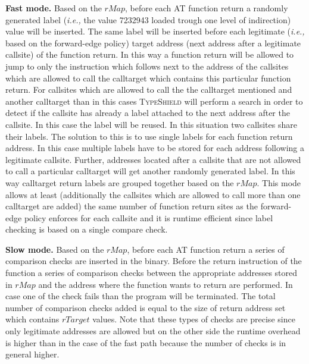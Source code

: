 \textbf{Fast mode.} Based on the $rMap$, before each AT function return a randomly generated label (\textit{i.e.,} the value 7232943 loaded trough one level of indirection) 
value will be inserted. The same label will be inserted before each legitimate (\textit{i.e.,} based on the forward-edge policy) target address (next address after a legitimate callsite) of the function return. 
In this way a function return will be allowed to jump to only the instruction which follows next to the 
address of the callsites which are allowed to call the calltarget which contains this particular function return. 
For callsites which are allowed to call the the calltarget mentioned and another calltarget than in this cases \textsc{TypeShield} will perform a search in order to detect if the callsite
has already a label attached to the next address after the callsite. In this case the label will be reused. In this situation two callsites share their labels. The solution to this is to 
use single labels for each function return address. In this case multiple labels have to be stored for each address following a legitimate callsite.
Further, addresses located after a callsite that are not allowed to call a particular calltarget will get another randomly generated label. 
In this way calltarget return labels are grouped together based on the $rMap$. This mode allows 
at least (additionally the callsites which are allowed to call more than one calltarget are added) the same number of function return sites as the 
forward-edge policy enforces for each callsite and it is runtime efficient since label checking is based on a single compare check.

\textbf{Slow mode.} Based on the $rMap$, before each AT function return a series of comparison checks are inserted in the binary. 
Before the return instruction of the function a series of comparison checks between the appropriate 
addresses stored in $rMap$ and the address where the function wants to return are performed. In case one of the check fails than the 
program will be terminated. The total number of comparison checks added is equal to the size of return address set which contains $rTarget$ values. 
Note that these types of checks are precise since only legitimate addresses are allowed but on the other side the runtime overhead is higher than in the 
case of the fast path because the number of checks is in general higher.
 



